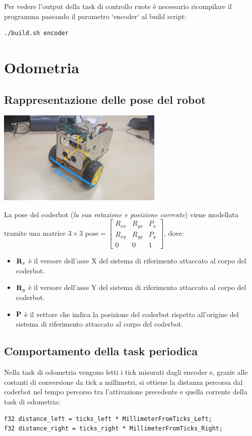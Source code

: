 \documentclass[11pt]{article}
\begin{document}
Per vedere l'output della task di controllo ruote è necessario ricompilare il programma passando il parametro `encoder` al build script:
\begin{verbatim}
./build.sh encoder
\end{verbatim}
\section{Odometria}
\label{sec:orgb8c87bf}
\subsection{Rappresentazione delle pose del robot}
\label{sec:orge782439}
\begin{center}
\includegraphics[width=300]{./img/coderbot-graph.jpg}
\end{center}

La pose del coderbot (\emph{la sua rotazione e posizione corrente}) viene modellata tramite una matrice \(3\times3\)  \(\text{pose}=\begin{bmatrix}R_{xx}&R_{yx}&P_x\\R_{xy}&R_{yy}&P_y\\0&0&1\end{bmatrix}\), dove:
\begin{itemize}
\item \(\bold R_{x}\) è il versore dell'asse X del sistema di riferimento attaccato al corpo del coderbot.
\item \(\bold R_{y}\) è il versore dell'asse Y del sistema di riferimento attaccato al corpo del coderbot.
\item \(\bold P\) è il vettore che indica la posizione del coderbot rispetto all'origine del sistema di riferimento attaccato al corpo del coderbot.
\end{itemize}
\subsection{Comportamento della task periodica}
\label{sec:org7e2259d}
Nella task di odometria vengono letti i tick misurati dagli encoder e, grazie alle costanti di conversione da tick a millimetri, si ottiene la distanza percorsa dal coderbot nel tempo percorso tra l'attivazione precedente e quella corrente della task di odometria:
\begin{verbatim}
f32 distance_left = ticks_left * MillimeterFromTicks_Left;
f32 distance_right = ticks_right * MillimeterFromTicks_Right;
\end{verbatim}
\end{document}
